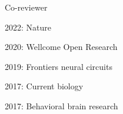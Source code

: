 
\begin{cventries}
\cventry
    {Co-reviewer} %
    {} %
    {} %
    {} %
    {
      \begin{cvitems} %
      \setlength\itemsep{0.5em}
          \item {2022: Nature}
          \item {2020: Wellcome Open Research}
          \item {2019: Frontiers neural circuits}
          \item {2017: Current biology}
          \item {2017: Behavioral brain research}
      \end{cvitems}
    }
\end{cventries} 

